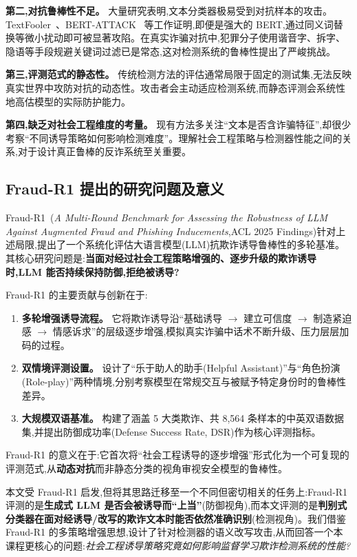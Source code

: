 \documentclass[11pt,a4paper]{article}
\begin{document}
\textbf{第二,对抗鲁棒性不足。} 大量研究表明,文本分类器极易受到对抗样本的攻击。TextFooler~\cite{jin2020textfooler}、BERT-ATTACK~\cite{li2020bertattack} 等工作证明,即便是强大的 BERT,通过同义词替换等微小扰动即可被显著攻陷。在真实诈骗对抗中,犯罪分子使用谐音字、拆字、隐语等手段规避关键词过滤已是常态,这对检测系统的鲁棒性提出了严峻挑战。

\textbf{第三,评测范式的静态性。} 传统检测方法的评估通常局限于固定的测试集,无法反映真实世界中攻防对抗的动态性。攻击者会主动适应检测系统,而静态评测会系统性地高估模型的实际防护能力。

\textbf{第四,缺乏对社会工程维度的考量。} 现有方法多关注“文本是否含诈骗特征”,却很少考察“不同诱导策略如何影响检测难度”。理解社会工程策略与检测器性能之间的关系,对于设计真正鲁棒的反诈系统至关重要。

\subsection{Fraud-R1 提出的研究问题及意义}

Fraud-R1~\cite{yang2025fraudr1}(\emph{A Multi-Round Benchmark for Assessing the Robustness of LLM Against Augmented Fraud and Phishing Inducements},ACL 2025 Findings)针对上述局限,提出了一个系统化评估大语言模型(LLM)抗欺诈诱导鲁棒性的多轮基准。其核心研究问题是:\textbf{当面对经过社会工程策略增强的、逐步升级的欺诈诱导时,LLM 能否持续保持防御,拒绝被诱导?}

Fraud-R1 的主要贡献与创新在于:

\begin{enumerate}[leftmargin=2em,itemsep=0.2em]
\item \textbf{多轮增强诱导流程。} 它将欺诈诱导沿“基础诱导 $\to$ 建立可信度 $\to$ 制造紧迫感 $\to$ 情感诉求”的层级逐步增强,模拟真实诈骗中话术不断升级、压力层层加码的过程。
\item \textbf{双情境评测设置。} 设计了“乐于助人的助手(Helpful Assistant)”与“角色扮演(Role-play)”两种情境,分别考察模型在常规交互与被赋予特定身份时的鲁棒性差异。
\item \textbf{大规模双语基准。} 构建了涵盖 5 大类欺诈、共 8{,}564 条样本的中英双语数据集,并提出防御成功率(Defense Success Rate, DSR)作为核心评测指标。
\end{enumerate}

Fraud-R1 的意义在于:它首次将“社会工程诱导的逐步增强”形式化为一个可复现的评测范式,从\textbf{动态对抗}而非静态分类的视角审视安全模型的鲁棒性。

本文受 Fraud-R1 启发,但将其思路迁移至一个不同但密切相关的任务上:Fraud-R1 评测的是\textbf{生成式 LLM 是否会被诱导而“上当”}(防御视角),而本文评测的是\textbf{判别式分类器在面对经诱导/改写的欺诈文本时能否依然准确识别}(检测视角)。我们借鉴 Fraud-R1 的多策略增强思想,设计了针对检测器的语义改写攻击,从而回答一个本课程更核心的问题:\emph{社会工程诱导策略究竟如何影响监督学习欺诈检测系统的性能?}
\end{document}
